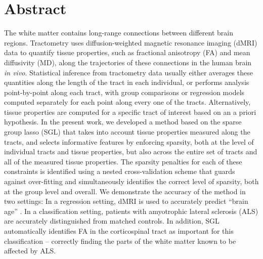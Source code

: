 \section*{Abstract}

The white matter contains long-range connections between different brain
regions. Tractometry uses diffusion-weighted magnetic resonance imaging (dMRI)
data to quantify tissue properties, such as fractional anisotropy (FA) and mean
diffusivity (MD), along the trajectories of these connections in the human brain
\emph{in vivo}\cite{yeatman2012tract}. Statistical inference from tractometry
data usually either averages these quantities along the length of the tract in
each individual, or performs analysis point-by-point along each tract, with
group comparisons or regression models computed separately for each point along
every one of the tracts. Alternatively, tissue properties are computed for a
specific tract of interest based on an a priori hypothesis. In the present work,
we developed a method based on the sparse group lasso (SGL)
\cite{simon2013sparse} that takes into account tissue properties measured along
the tracts, and selects informative features by enforcing sparsity, both at the
level of individual tracts and tissue properties, but also across the entire set
of tracts and all of the measured tissue properties. The sparsity penalties for
each of these constraints is identified using a nested cross-validation scheme
that guards against over-fitting and simultaneously identifies the correct level
of sparsity, both at the group level and overall. We demonstrate the accuracy of
the method in two settings: In a regression setting, dMRI is used to accurately
predict ``brain age'' \cite{yeatman2014lifespan, Brown2012-so}. In a
classification setting, patients with amyotrophic lateral sclerosis (ALS) are
accurately distinguished from matched controls\cite{sarica2017corticospinal}. In
addition, SGL automatically identifies FA in the corticospinal tract as
important for this classification -- correctly finding the parts of the white
matter known to be affected by ALS. 